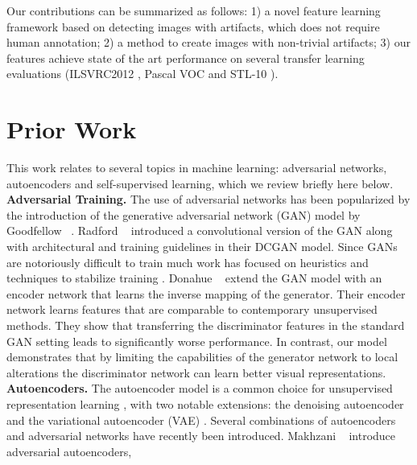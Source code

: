 \documentclass[10pt,twocolumn,letterpaper]{article}
\begin{document}
Our contributions can be summarized as follows: 1) a novel feature learning framework based on detecting images with artifacts, which does not require human annotation; 2) a method to create images with non-trivial artifacts; 3) our features achieve state of the art performance on several transfer learning evaluations (ILSVRC2012 \cite{imagenet_cvpr09}, Pascal VOC \cite{everingham2010pascal} and STL-10 \cite{coates2011analysis}).








\section{Prior Work}

This work relates to several topics in machine learning: adversarial networks, autoencoders and self-supervised learning, which we review briefly here below.\\
\textbf{Adversarial Training.}
The use of adversarial networks has been popularized by the introduction of the generative adversarial network (GAN) model by Goodfellow \etal~\cite{goodfellow2014generative}.
Radford \etal~\cite{radford2015unsupervised} introduced a convolutional version of the GAN along with architectural and training guidelines in their DCGAN model. 
Since GANs are notoriously difficult to train much work has focused on heuristics and techniques to stabilize training \cite{salimans2016improved,radford2015unsupervised}.
Donahue \etal~\cite{donahue2016adversarial} extend the GAN model with an encoder network that learns the inverse mapping of the generator. Their encoder network learns features that are comparable to contemporary unsupervised methods. They show that transferring the discriminator features in the standard GAN setting leads to significantly worse performance. In contrast, our model demonstrates that by limiting the capabilities of the generator network to local alterations the discriminator network can learn better visual representations. \\
\textbf{Autoencoders.}
The autoencoder model is a common choice for unsupervised representation learning  \cite{hinton1994autoencoders}, with two notable extensions: the denoising autoencoder \cite{vincent2010stacked} and the variational autoencoder (VAE) \cite{kingma2013auto}.
Several combinations of autoencoders and adversarial networks have recently been introduced. Makhzani \etal~\cite{makhzani2015adversarial} introduce adversarial autoencoders,
\end{document}
